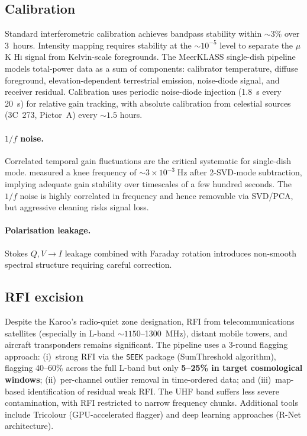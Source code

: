 \documentclass[10pt,a4paper]{article}
\begin{document}
\subsection{Calibration}

Standard interferometric calibration achieves bandpass stability within
$\sim\!3\%$ over 3~hours.  Intensity mapping requires stability at the
$\sim\!10^{-5}$ level to separate the $\mu$K H\textsc{i} signal from
Kelvin-scale foregrounds.  The MeerKLASS single-dish pipeline
\citep{Wang2021} models total-power data as a sum of components: calibrator
temperature, diffuse foreground, elevation-dependent terrestrial emission,
noise-diode signal, and receiver residual.  Calibration uses periodic
noise-diode injection (1.8~s every 20~s) for relative gain tracking, with
absolute calibration from celestial sources (3C~273, Pictor~A) every
$\sim\!1.5$ hours.

\paragraph{$1/f$ noise.}
Correlated temporal gain fluctuations are the critical systematic for
single-dish mode.  \citet{Li2021} measured a knee frequency of
$\sim\!3 \times 10^{-3}\;\mathrm{Hz}$ after 2-SVD-mode subtraction, implying
adequate gain stability over timescales of a few hundred seconds.  The $1/f$
noise is highly correlated in frequency and hence removable via SVD/PCA, but
aggressive cleaning risks signal loss.

\paragraph{Polarisation leakage.}
Stokes $Q, V \to I$ leakage combined with Faraday rotation introduces
non-smooth spectral structure requiring careful correction.


\subsection{RFI excision}

Despite the Karoo's radio-quiet zone designation, RFI from
telecommunications satellites (especially in L-band $\sim\!1150$--1300~MHz),
distant mobile towers, and aircraft transponders remains significant.  The
\citet{Wang2021} pipeline uses a 3-round flagging approach: (i)~strong RFI via
the \texttt{SEEK} package (SumThreshold algorithm), flagging 40--60\% across
the full L-band but only \textbf{5--25\% in target cosmological windows};
(ii)~per-channel outlier removal in time-ordered data; and (iii)~map-based
identification of residual weak RFI.  The UHF band suffers less severe
contamination, with RFI restricted to narrow frequency chunks.  Additional
tools include Tricolour (GPU-accelerated flagger) and deep learning approaches
(R-Net architecture).
\end{document}
